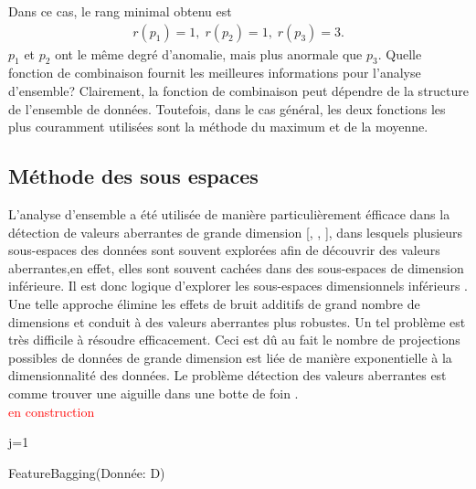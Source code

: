 Dans ce cas, le rang minimal obtenu est
\begin{align*}
r\left(p_{1}\right)=1,\; r\left(p_{2}\right)=1,\; r \left(p_{3}\right)=3.
\end{align*}
$p_1$ et $p_2$ ont le même degré d'anomalie, mais plus anormale que $p_3$. 
Quelle fonction de combinaison fournit les meilleures informations pour l'analyse d'ensemble?
Clairement, la fonction de combinaison peut dépendre de la structure de l'ensemble de données. Toutefois, dans le cas général, les deux fonctions les plus couramment utilisées sont la méthode du maximum et de la moyenne.
\subsection{Méthode des sous espaces}
L'analyse d'ensemble a été utilisée de manière particulièrement éfficace dans la détection de valeurs aberrantes de grande dimension [\cite{A8}, \cite{A13}, \cite{A14}], dans lesquels plusieurs sous-espaces des données sont souvent explorées afin de découvrir des valeurs aberrantes,en effet, elles sont souvent cachées dans des sous-espaces de dimension inférieure. Il est donc logique d'explorer les sous-espaces dimensionnels inférieurs \cite{A1}. Une telle approche élimine les effets de bruit additifs de grand nombre de dimensions et conduit à des valeurs aberrantes plus robustes. Un tel problème est très difficile à résoudre efficacement. Ceci est dû au fait le nombre de projections possibles de données de grande dimension est liée de manière exponentielle à la dimensionnalité des données. Le problème détection des valeurs aberrantes est comme trouver une aiguille dans une botte de foin \cite{A14}. \\
\textcolor{red}{en construction}

\begin{algorithm}
\SetAlgoLined
j=1\;
\caption{FeatureBagging(Donnée: D)}
\end{algorithm}